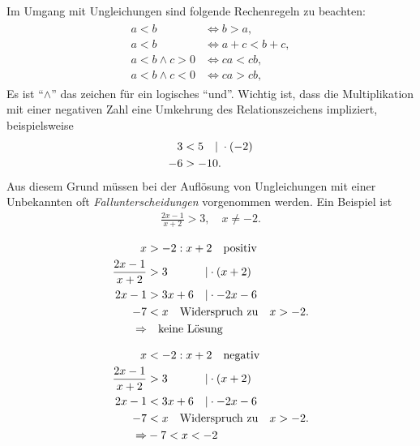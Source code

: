 Im Umgang mit Ungleichungen sind folgende Rechenregeln zu beachten: 
\begin{align}
    \begin{split}
        a < b &\Longleftrightarrow b>a, \\
        a < b &\Longleftrightarrow a+c < b+c,\\
        a < b \wedge c > 0 &\Longleftrightarrow ca < cb, \\
        a < b \wedge c < 0 &\Longleftrightarrow ca > cb, 
    \end{split}
\end{align}
Es ist ``$\wedge$'' das zeichen für ein logisches ``und''. Wichtig ist, dass die Multiplikation mit einer negativen Zahl eine Umkehrung des Relationszeichens impliziert, beispielsweise 
\begin{align}
    3 &< 5 \quad |\; \cdot (-2) \notag \\
    -6 &> -10. 
\end{align}
Aus diesem Grund müssen bei der Auflösung von Ungleichungen mit einer Unbekannten oft \emph{Fallunterscheidungen} vorgenommen werden. Ein Beispiel ist 
\begin{align}
    \frac{2x-1}{x+2} > 3, \quad x\neq -2.
\end{align}

\begin{minipage}{0.45\textwidth}
    \begin{align*}
        x &> -2: x+2 \qq{positiv}\\
        \frac{2x-1}{x+2} &> 3\hphantom{x+6} \quad |\cdot (x+2) \\
        2x-1 &> 3x+6  \quad |\cdot -2x-6 \\
        -7 &< x   \qq{Widerspruch zu} x > -2. \\
        \Rightarrow & \qq{keine Lösung}
    \end{align*}
\end{minipage}
\hfill\vline\hfill
\begin{minipage}{0.45\textwidth}
    \begin{align*}
        x &< -2: x+2 \qq{negativ}\\
        \frac{2x-1}{x+2} &> 3\hphantom{x+6} \quad |\cdot (x+2) \\
        2x-1 &< 3x+6  \quad |\cdot -2x-6 \\
        -7 &< x   \qq{Widerspruch zu} x > -2. \\
        \Rightarrow & -7 < x < -2
    \end{align*}
\end{minipage}

